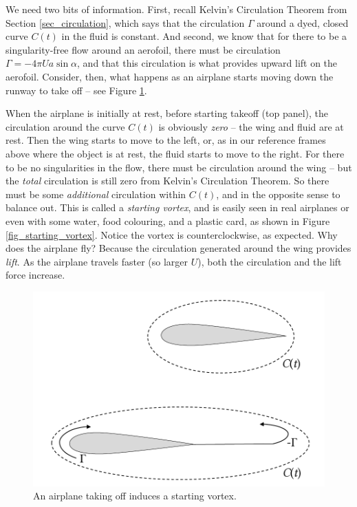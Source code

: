 We need two bits of information.  First, recall Kelvin's Circulation Theorem from Section \ref{sec_circulation}, which says that the circulation $\Gamma$ around a dyed, closed curve $C(t)$ in the fluid is constant.  And second, we know that for there to be a singularity-free flow around an aerofoil, there must be circulation $\Gamma = -4\pi Ua \sin \alpha$, and that this circulation is what provides upward lift on the aerofoil.  Consider, then, what happens as an airplane starts moving down the runway to take off -- see Figure \ref{fig_airplane}.

When the airplane is initially at rest, before starting takeoff (top panel), the circulation around the curve $C(t)$ is obviously \emph{zero} -- the wing and fluid are at rest.  Then the wing starts to move to the left, or, as in our reference frames above where the object is at rest, the fluid starts to move to the right.  For there to be no singularities in the flow, there must be circulation around the wing -- but the \emph{total} circulation is still zero from Kelvin's Circulation Theorem.  So there must be some \emph{additional} circulation within $C(t)$, and in the opposite sense to balance out.  This is called a \emph{starting vortex}, and is easily seen in real airplanes or even with some water, food colouring, and a plastic card, as shown in Figure \ref{fig_starting_vortex}.  Notice the vortex is counterclockwise, as expected.  Why does the airplane fly?  Because the circulation generated around the wing provides \emph{lift}.  As the airplane travels faster (so larger $U$), both the circulation and the lift force increase.

\begin{figure}
\centering\includegraphics[width=0.8\linewidth]{Figures/Chapter4/fig_airplane}
\caption{An airplane taking off induces a starting vortex.}
\label{fig_airplane}
\end{figure}

